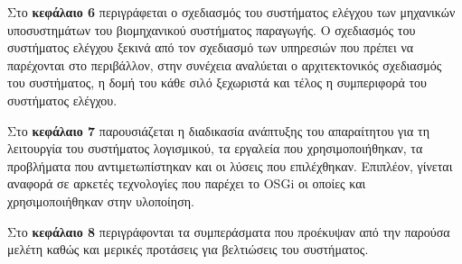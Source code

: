 Στο \textbf{κεφάλαιο 6} περιγράφεται ο σχεδιασμός του συστήματος ελέγχου των μηχανικών υποσυστημάτων του βιομηχανικού συστήματος παραγωγής. Ο σχεδιασμός του συστήματος ελέγχου ξεκινά από τον σχεδιασμό των υπηρεσιών που πρέπει να παρέχονται στο περιβάλλον, στην συνέχεια αναλύεται ο αρχιτεκτονικός σχεδιασμός του συστήματος, η δομή του κάθε σιλό ξεχωριστά και τέλος η συμπεριφορά του συστήματος ελέγχου. 

Στο \textbf{κεφάλαιο 7} παρουσιάζεται η διαδικασία ανάπτυξης του απαραίτητου για τη λειτουργία του συστήματος λογισμικού, τα εργαλεία που χρησιμοποιήθηκαν, τα προβλήματα που αντιμετωπίστηκαν και οι λύσεις που επιλέχθηκαν. Επιπλέον, γίνεται αναφορά σε αρκετές τεχνολογίες που παρέχει το OSGi οι οποίες και χρησιμοποιήθηκαν στην υλοποίηση. 

Στο \textbf{κεφάλαιο 8} περιγράφονται τα συμπεράσματα που προέκυψαν από την παρούσα μελέτη καθώς και μερικές προτάσεις για βελτιώσεις του συστήματος.


\newpage \pagestyle{fancy} \mbox{}